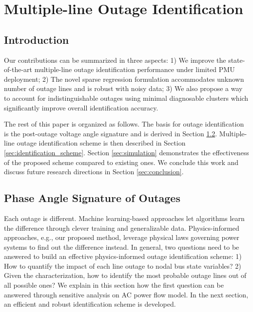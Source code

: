 
\chapter{Multiple-line Outage Identification}
\label{ch:identification}
\vspace{2em}

\section{Introduction} %
\label{sec:introduction}

Our contributions can be summarized in three aspects: 1) We improve the state-of-the-art multiple-line outage identification performance under limited PMU deployment; 2) The novel sparse regression formulation accommodates unknown number of outage lines and is robust with noisy data; 3)
We also propose a way to account for indistinguishable outages using minimal diagnosable clusters which significantly improve overall identification accuracy.

The rest of this paper is organized as follows. The basis for outage identification is the post-outage voltage angle signature and is derived in Section \ref{sec:angle_signature}. Multiple-line outage identification scheme is then described in Section \ref{sec:identification_scheme}. Section \ref{sec:simulation} demonstrates the effectiveness of the proposed scheme compared to existing ones. We conclude this work and discuss future research directions in Section \ref{sec:conclusion}. 

\section{Phase Angle Signature of Outages}
\label{sec:angle_signature}

Each outage is different. Machine learning-based approaches let algorithms learn the difference through clever training and generalizable data. Physics-informed approaches, e.g., our proposed method, leverage physical laws governing power systems to find out the difference instead. In general, two questions need to be answered to build an effective physics-informed outage identification scheme: 1) How to quantify the impact of each line outage to nodal bus state variables? 2) Given the characterization, how to identify the most probable outage lines out of all possible ones? We explain in this section how the first question can be answered through sensitive analysis on AC power flow model. In the next section, an efficient and robust identification scheme is developed. 

